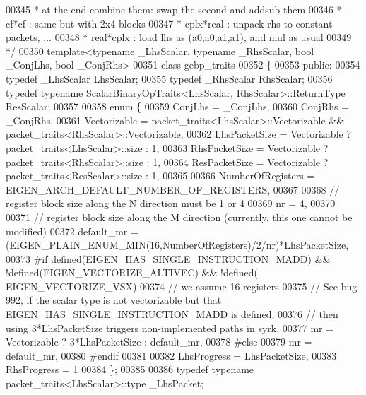 \begin{DoxyCode}
00345 \textcolor{comment}{ *          at the end combine them: swap the second and addsub them }
00346 \textcolor{comment}{ *  cf*cf : same but with 2x4 blocks}
00347 \textcolor{comment}{ *  cplx*real : unpack rhs to constant packets, ...}
00348 \textcolor{comment}{ *  real*cplx : load lhs as (a0,a0,a1,a1), and mul as usual}
00349 \textcolor{comment}{ */}
00350 \textcolor{keyword}{template}<\textcolor{keyword}{typename} \_LhsScalar, \textcolor{keyword}{typename} \_RhsScalar, \textcolor{keywordtype}{bool} \_ConjLhs, \textcolor{keywordtype}{bool} \_ConjRhs>
00351 \textcolor{keyword}{class }gebp\_traits
00352 \{
00353 \textcolor{keyword}{public}:
00354   \textcolor{keyword}{typedef} \_LhsScalar LhsScalar;
00355   \textcolor{keyword}{typedef} \_RhsScalar RhsScalar;
00356   \textcolor{keyword}{typedef} \textcolor{keyword}{typename} ScalarBinaryOpTraits<LhsScalar, RhsScalar>::ReturnType ResScalar;
00357 
00358   \textcolor{keyword}{enum} \{
00359     ConjLhs = \_ConjLhs,
00360     ConjRhs = \_ConjRhs,
00361     Vectorizable = packet\_traits<LhsScalar>::Vectorizable && packet\_traits<RhsScalar>::Vectorizable,
00362     LhsPacketSize = Vectorizable ? packet\_traits<LhsScalar>::size : 1,
00363     RhsPacketSize = Vectorizable ? packet\_traits<RhsScalar>::size : 1,
00364     ResPacketSize = Vectorizable ? packet\_traits<ResScalar>::size : 1,
00365     
00366     NumberOfRegisters = EIGEN\_ARCH\_DEFAULT\_NUMBER\_OF\_REGISTERS,
00367 
00368     \textcolor{comment}{// register block size along the N direction must be 1 or 4}
00369     nr = 4,
00370 
00371     \textcolor{comment}{// register block size along the M direction (currently, this one cannot be modified)}
00372     default\_mr = (EIGEN\_PLAIN\_ENUM\_MIN(16,NumberOfRegisters)/2/nr)*LhsPacketSize,
00373 #\textcolor{keywordflow}{if} defined(EIGEN\_HAS\_SINGLE\_INSTRUCTION\_MADD) && !defined(EIGEN\_VECTORIZE\_ALTIVEC) && !defined(
      EIGEN\_VECTORIZE\_VSX)
00374     \textcolor{comment}{// we assume 16 registers}
00375     \textcolor{comment}{// See bug 992, if the scalar type is not vectorizable but that EIGEN\_HAS\_SINGLE\_INSTRUCTION\_MADD is
       defined,}
00376     \textcolor{comment}{// then using 3*LhsPacketSize triggers non-implemented paths in syrk.}
00377     mr = Vectorizable ? 3*LhsPacketSize : default\_mr,
00378 \textcolor{preprocessor}{#else}
00379     mr = default\_mr,
00380 \textcolor{preprocessor}{#endif}
00381     
00382     LhsProgress = LhsPacketSize,
00383     RhsProgress = 1
00384   \};
00385 
00386   \textcolor{keyword}{typedef} \textcolor{keyword}{typename} packet\_traits<LhsScalar>::type  \_LhsPacket;

\end{DoxyCode}

